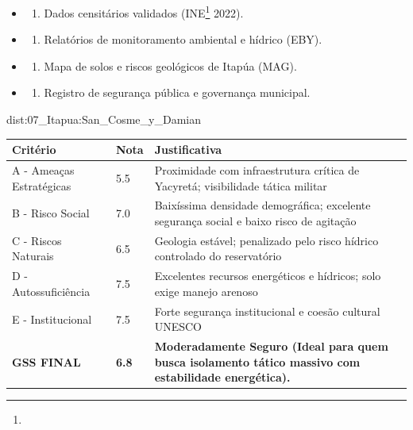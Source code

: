 {\begin{itemize}
\tightlist
\item
  \begin{enumerate}
  \def\labelenumi{\arabic{enumi})}
  \tightlist
  \item
    Dados censitários validados (INE\footnote{\fineINE} 2022).
  \end{enumerate}
\item
  \begin{enumerate}
  \def\labelenumi{\arabic{enumi})}
  \setcounter{enumi}{1}
  \tightlist
  \item
    Relatórios de monitoramento ambiental e hídrico (EBY).
  \end{enumerate}
\item
  \begin{enumerate}
  \def\labelenumi{\arabic{enumi})}
  \setcounter{enumi}{2}
  \tightlist
  \item
    Mapa de solos e riscos geológicos de Itapúa (MAG).
  \end{enumerate}
\item
  \begin{enumerate}
  \def\labelenumi{\arabic{enumi})}
  \setcounter{enumi}{3}
  \tightlist
  \item
    Registro de segurança pública e governança municipal.
  \end{enumerate}
\end{itemize}}{dist:07_Itapua:San_Cosme_y_Damian}
\begin{table}[ht!]
\small \begin{tabular}{p{3.0cm}p{0.8cm}p{6.0cm}} \toprule
\textbf{Critério} & \textbf{Nota} & \textbf{Justificativa} \\ \midrule
A - Ameaças Estratégicas & 5.5 & Proximidade com infraestrutura crítica de Yacyretá; visibilidade tática militar \\
B - Risco Social & 7.0 & Baixíssima densidade demográfica; excelente segurança social e baixo risco de agitação \\
C - Riscos Naturais & 6.5 & Geologia estável; penalizado pelo risco hídrico controlado do reservatório \\
D - Autossuficiência & 7.5 & Excelentes recursos energéticos e hídricos; solo exige manejo arenoso \\
E - Institucional & 7.5 & Forte segurança institucional e coesão cultural UNESCO \\
\midrule \textbf{GSS FINAL} & \textbf{6.8} & \textbf{Moderadamente Seguro (Ideal para quem busca isolamento tático massivo com estabilidade energética).} \\ \bottomrule \end{tabular}
\end{table}
